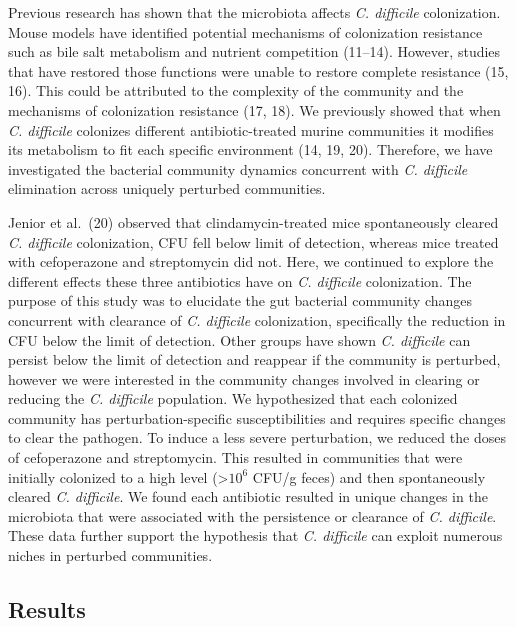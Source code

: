 \documentclass[11pt,]{article}
\begin{document}
Previous research has shown that the microbiota affects \emph{C.
difficile} colonization. Mouse models have identified potential
mechanisms of colonization resistance such as bile salt metabolism and
nutrient competition (11--14). However, studies that have restored those
functions were unable to restore complete resistance (15, 16). This
could be attributed to the complexity of the community and the
mechanisms of colonization resistance (17, 18). We previously showed
that when \emph{C. difficile} colonizes different antibiotic-treated
murine communities it modifies its metabolism to fit each specific
environment (14, 19, 20). Therefore, we have investigated the bacterial
community dynamics concurrent with \emph{C. difficile} elimination
across uniquely perturbed communities.

Jenior et al.~(20) observed that clindamycin-treated mice spontaneously
cleared \emph{C. difficile} colonization, CFU fell below limit of
detection, whereas mice treated with cefoperazone and streptomycin did
not. Here, we continued to explore the different effects these three
antibiotics have on \emph{C. difficile} colonization. The purpose of
this study was to elucidate the gut bacterial community changes
concurrent with clearance of \emph{C. difficile} colonization,
specifically the reduction in CFU below the limit of detection. Other
groups have shown \emph{C. difficile} can persist below the limit of
detection and reappear if the community is perturbed, however we were
interested in the community changes involved in clearing or reducing the
\emph{C. difficile} population. We hypothesized that each colonized
community has perturbation-specific susceptibilities and requires
specific changes to clear the pathogen. To induce a less severe
perturbation, we reduced the doses of cefoperazone and streptomycin.
This resulted in communities that were initially colonized to a high
level (\textgreater{}\(10^{6}\) CFU/g feces) and then spontaneously
cleared \emph{C. difficile}. We found each antibiotic resulted in unique
changes in the microbiota that were associated with the persistence or
clearance of \emph{C. difficile}. These data further support the
hypothesis that \emph{C. difficile} can exploit numerous niches in
perturbed communities.

\hypertarget{results}{%
\subsection{Results}\label{results}}
\end{document}
